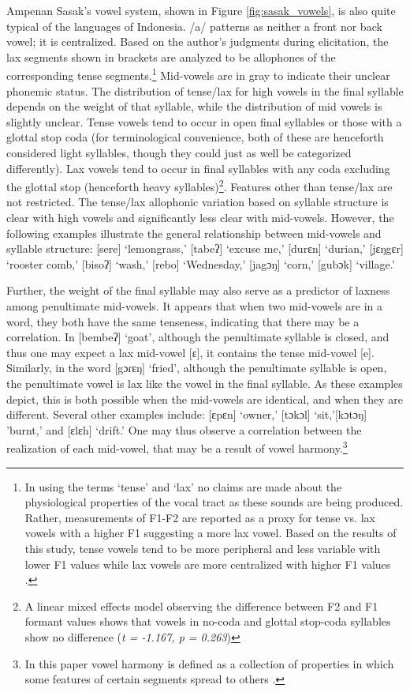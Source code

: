 \documentclass[12pt]{ouparticle}
\begin{document}
Ampenan Sasak’s vowel system, shown in Figure \ref{fig:sasak_vowels}, is also quite typical of the languages of Indonesia. /a/ patterns as neither a front nor back vowel; it is centralized. Based on the author's judgments during elicitation, the lax segments shown in brackets are analyzed to be allophones of the corresponding tense segments.\footnote{In using the terms `tense' and `lax' no claims are made about the physiological properties of the vocal tract as these sounds are being produced. Rather, measurements of F1-F2 are reported as a proxy for tense vs. lax vowels with a higher F1 suggesting a more lax vowel. Based on the results of this study, tense vowels tend to be more peripheral and less variable with lower F1 values while lax vowels are more centralized with higher F1 values \citep{wood1975,halle1977}.}  Mid-vowels are in gray to indicate their unclear phonemic status. The distribution of tense/lax for high vowels in the final syllable depends on the weight of that syllable, while the distribution of mid vowels is slightly unclear. Tense vowels tend to occur in open final syllables or those with a glottal stop coda (for terminological convenience, both of these are henceforth considered light syllables, though they could just as well be categorized differently). Lax vowels tend to occur in final syllables with any coda excluding the glottal stop (henceforth heavy syllables)\footnote{A linear mixed effects model observing the difference between F2 and F1 formant values shows that vowels in no-coda and glottal stop-coda syllables show no difference (\textit{t = -1.167, p = 0.263})}. Features other than tense/lax are not restricted. The tense/lax allophonic variation based on syllable structure is clear with high vowels and significantly less clear with mid-vowels. However, the following examples illustrate the general relationship between mid-vowels and syllable structure: [sere] `lemongrass,' [tabeʔ] `excuse me,' [durɛn] `durian,' [jɛŋgɛr] `rooster comb,' [bisoʔ] `wash,' [rebo] `Wednesday,' [jagɔŋ] `corn,' [gubɔk] `village.'

Further, the weight of the final syllable may also serve as a predictor of laxness among penultimate mid-vowels. It appears that when two mid-vowels are in a word, they both have the same tenseness, indicating that there may be a correlation. In [bembeʔ] `goat', although the penultimate syllable is closed, and thus one may expect a lax mid-vowel [ɛ], it contains the tense mid-vowel [e]. Similarly, in the word [gɔɾɛŋ] `fried', although the penultimate syllable is open, the penultimate vowel is lax like the vowel in the final syllable. As these examples depict, this is both possible when the mid-vowels are identical, and when they are different. Several other examples include: [ɛpɛn] `owner,' [tɔkɔl] `sit,'[kɔtɔŋ] 'burnt,' and [ɛlɛh] `drift.' One may thus observe a correlation between the realization of each mid-vowel, that may be a result of vowel harmony.\footnote{In this paper vowel harmony is defined as a collection of properties in which some features of certain segments spread to others \citep{wood1975}.}
\end{document}

